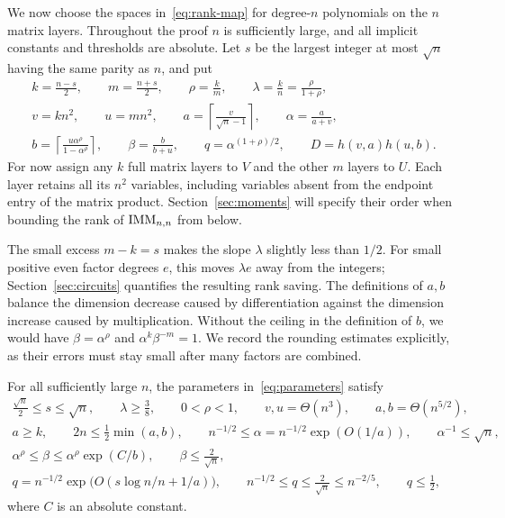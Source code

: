 We now choose the spaces in~\eqref{eq:rank-map} for degree-$n$
polynomials on the $n$ matrix layers.  Throughout the proof $n$ is
sufficiently large, and all implicit constants and thresholds are
absolute.  Let $s$ be the largest integer at most $\sqrt n$ having the
same parity as $n$, and put
\begin{equation}
\label{eq:parameters}
\begin{gathered}
 k=\frac{n-s}{2},\qquad m=\frac{n+s}{2},\qquad
 \rho=\frac{k}{m},\qquad \lambda=\frac{k}{n}
       =\frac{\rho}{1+\rho},\\
 v=kn^2,\qquad u=mn^2,\qquad
 a=\left\lceil\frac{v}{\sqrt n-1}\right\rceil,
 \qquad \alpha=\frac{a}{a+v},\\
 b=\left\lceil\frac{u\alpha^\rho}{1-\alpha^\rho}\right\rceil,
 \qquad \beta=\frac{b}{b+u},\qquad
 q=\alpha^{(1+\rho)/2},\qquad D=h(v,a)h(u,b).
\end{gathered}
\end{equation}
For now assign any $k$ full matrix layers to $V$ and the other $m$
layers to $U$.  Each layer retains all its $n^2$ variables, including
variables absent from the endpoint entry of the matrix product.
Section~\ref{sec:moments} will specify their order when bounding the
rank of $\operatorname{IMM}_{n,n}$ from below.

The small excess $m-k=s$ makes the slope $\lambda$ slightly less than
$1/2$.  For small positive even factor degrees $e$, this moves
$\lambda e$ away from the integers; Section~\ref{sec:circuits}
quantifies the resulting rank saving.  The definitions of $a,b$
balance the dimension decrease caused by differentiation against the
dimension increase caused by multiplication.  Without the ceiling in
the definition of $b$, we would have $\beta=\alpha^\rho$ and
$\alpha^k\beta^{-m}=1$.  We record the rounding estimates explicitly,
as their errors must stay small after many factors are combined.

\begin{lemma}
\label{lem:parameters}
For all sufficiently large $n$, the parameters in~\eqref{eq:parameters}
satisfy
\begin{gather*}
 \frac{\sqrt n}{2}\le s\le\sqrt n,\qquad
 \lambda\ge\frac38,\qquad 0<\rho<1,\qquad
 v,u=\Theta(n^3),\qquad a,b=\Theta(n^{5/2}),\\
 a\ge k,\qquad 2n\le\frac12\min(a,b),\qquad
 n^{-1/2}\le\alpha=n^{-1/2}\exp(O(1/a)),\qquad
 \alpha^{-1}\le\sqrt n,\\
 \alpha^\rho\le\beta\le\alpha^\rho\exp(C/b),
 \qquad \beta\le\frac2{\sqrt n},\\
 q=n^{-1/2}\exp\bigl(O(s\log n/n+1/a)\bigr),
 \qquad n^{-1/2}\le q\le\frac2{\sqrt n}
 \le n^{-2/5},\qquad q\le\frac12,
\end{gather*}
where $C$ is an absolute constant.
\end{lemma}

